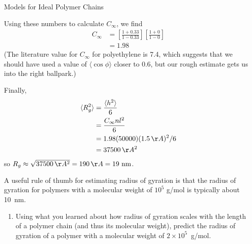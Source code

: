 \begin{activity}{Models for Ideal Polymer Chains}
\begin{exercises}
\begin{solution}
{			Using these numbers to calculate $C_\infty$, we find
			\begin{align*}
				C_\infty &= \left[\frac{1+0.33}{1-0.33}\right]\left[\frac{1+0}{1-0}\right]\\
				&= 1.98
			\end{align*}
			(The literature value for $C_\infty$ for polyethylene is 7.4, which suggests that we should have used a value of $\langle\cos\phi\rangle$ closer to 0.6, but our rough estimate gets us into the right ballpark.)
			
			Finally,
			\begin{align*}
				\langle R_g^2\rangle &= \frac{\langle h^2\rangle}{6}\\
				&= \frac{C_\infty n l^2}{6} \\
				&= 1.98(50000)(1.5\,\AA)^2/6\\
				&= 37500\,\AA^2
			\end{align*}
			so $R_g \approx \sqrt{37500\,\AA^2} = 190\,\AA = 19\text{ nm}$.
		}\end{solution}

	\exercise A useful rule of thumb for estimating radius of gyration is that the radius of gyration for polymers with a molecular weight of $10^5$ g/mol is typically about 10~nm.
	
		\begin{enumerate}
			\item Using what you learned about how radius of gyration scales with the length of a polymer chain (and thus its molecular weight), predict the radius of gyration of a polymer with a molecular weight of $2\times10^5$~g/mol.
	
		\begin{solution}\end{solution}
			

\end{enumerate}
\end{exercises}
\end{activity}
